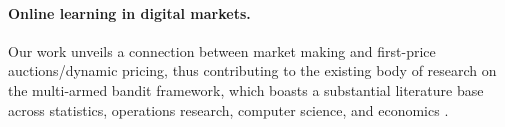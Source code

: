 \documentclass[final,12pt]{colt2025}
\begin{document}
\paragraph{Online learning in digital markets.}
Our work unveils a connection between market making and first-price auctions/dynamic pricing, thus contributing to the existing body of research on
the multi-armed bandit framework, which boasts a substantial literature base across statistics, operations research, computer science, and economics \citep{auerFinitetimeAnalysisMultiarmed2002,lattimore2020bandit,badanidiyuru_bandits_2018,Kleinberg2004NearlyTB}.
\end{document}
